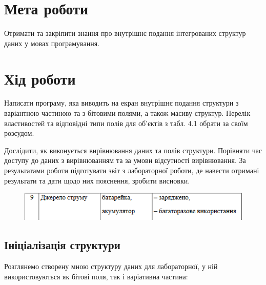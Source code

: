 \section{Мета роботи}
Отримати та закріпити знання про внутрішнє подання інтегрованих структур даних у мовах програмування.

\section{Хід роботи}
    Написати програму, яка виводить на екран внутрішнє подання
структури з варіантною частиною та з бітовими полями, а також масиву
структур. Перелік властивостей та відповідні типи полів для об’єктів з
табл. 4.1 обрати за своїм розсудом.

    Дослідити, як виконується вирівнювання даних та полів структури.
Порівняти час доступу до даних з вирівнюванням та за умови
відсутності вирівнювання. За результатами роботи підготувати звіт з
лабораторної роботи, де навести отримані результати та дати щодо них
пояснення, зробити висновки.

\begin{figure}[h!]
    \centering
    \includegraphics[width=14cm]{reports/algos/lab4/assets/1.png}
\end{figure}

\clearpage
\subsection{Ініціалізація структури}
Розглянемо створену мною структуру даних для лабораторної, у ній використовуються як бітові поля, так і варіативна частина:

